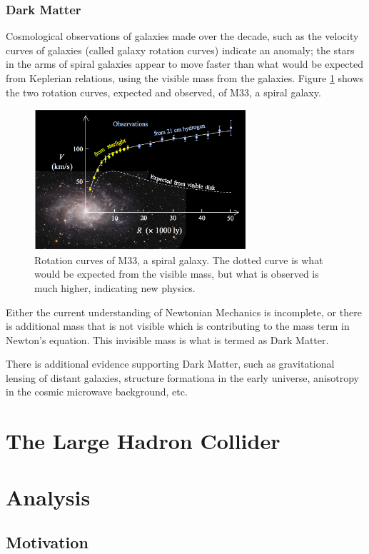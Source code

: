 \documentclass[11pt,a4paper]{report}
\begin{document}
\subsection{Dark Matter}
Cosmological observations of galaxies made over the decade, such as the velocity curves of galaxies (called galaxy rotation curves) indicate an anomaly; the stars in the arms of spiral galaxies appear to move faster than what would be expected from Keplerian relations, using the visible mass from the galaxies. Figure \ref{fig:grc} shows the two rotation curves, expected and observed, of M33, a spiral galaxy.\cite{galaxy}
\begin{figure}[H]
\centering
	\includegraphics[width=0.7\textwidth]{grc.png}
	\caption{Rotation curves of M33, a spiral galaxy. The dotted curve is what would be expected from the visible mass, but what is observed is much higher, indicating new physics.}
	\label{fig:grc}
\end{figure}
Either the current understanding of Newtonian Mechanics is incomplete, or there is additional mass that is not visible which is contributing to the mass term in Newton's equation. This invisible mass is what is termed as Dark Matter.

There is additional evidence supporting Dark Matter, such as gravitational lensing of distant galaxies, structure formationa in the early universe, anisotropy in the cosmic microwave background, etc.

\cleardoublepage
\chapter{The Large Hadron Collider}
\cleardoublepage
\chapter{Analysis}
\section{Motivation}
\cleardoublepage
\end{document}
